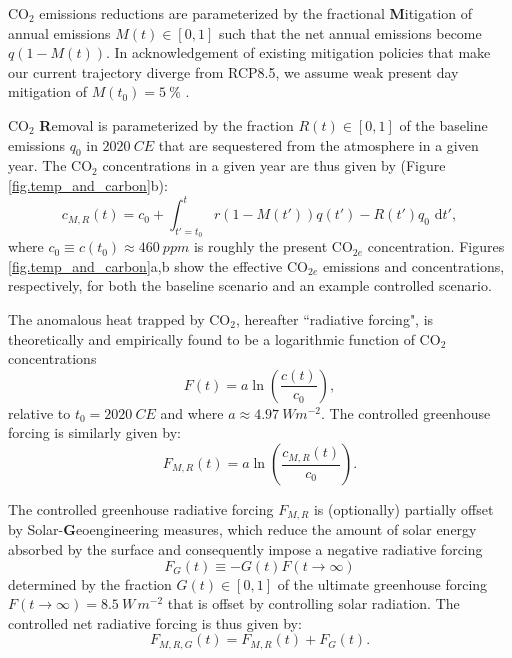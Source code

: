 \documentclass{article}
\begin{document}
CO$_{2}$ emissions reductions are parameterized by the fractional \textbf{M}itigation of annual emissions $M(t) \in [0,1]$ such that the net annual emissions become $q(1-M(t))$. In acknowledgement of existing mitigation policies that make our current trajectory diverge from RCP8.5, we assume weak present day mitigation of $M(t_{0}) = \SI{5}{\%}$ \citep{hausfather_emissions_2020}.

CO$_{2}$ \textbf{R}emoval is parameterized by the fraction $R(t) \in [0,1]$ of the baseline emissions $q_{0}$ in $\SI{2020}{CE}$ that are sequestered from the atmosphere in a given year. The CO$_{2}$ concentrations in a given year are thus given by (Figure \ref{fig.temp_and_carbon}b):
\begin{equation}
    c_{M, R}(t) = c_{0} + \int_{t'=t_{0}}^{t} r(1-M(t'))q(t') - R(t')q_{0} \text{ d}t'\label{eq-CO2-conc},
\end{equation}
where $c_{0} \equiv c(t_{0}) \approx \SI{460}{ppm}$ is roughly the present CO$_{2e}$ concentration. Figures \ref{fig.temp_and_carbon}a,b show the effective CO$_{2e}$ emissions and concentrations, respectively, for both the baseline scenario and an example controlled scenario.

The anomalous heat trapped by CO$_{2}$, hereafter ``radiative forcing", is theoretically and empirically found to be a logarithmic function of CO$_{2}$ concentrations
\begin{equation}
    F(t) = a \ln(\frac{c(t)}{c_{0}}),
\end{equation}
relative to $t_{0} = \SI{2020}{CE}$ and where $a \approx \SI{4.97}{W m^{-2}}$. The controlled greenhouse forcing is similarly given by:
\begin{equation}
    F_{M, R}(t) = a \ln(\frac{c_{M, R}(t)}{c_{0}}).
\end{equation}

The controlled greenhouse radiative forcing $F_{M, R}$ is (optionally) partially offset by Solar-\textbf{G}eoengineering measures, which reduce the amount of solar energy absorbed by the surface and consequently impose a negative radiative forcing
\begin{equation}
F_{G}(t) \equiv -G(t)F(t \rightarrow \infty)
\end{equation}
determined by the fraction $G(t) \in [0,1]$ of the ultimate greenhouse forcing  $F(t \rightarrow \infty) = \SI{8.5}{W\, m^{-2}}$ that is offset by controlling solar radiation. The controlled net radiative forcing is thus given by:
\begin{equation}
    F_{M, R, G}(t) = F_{M, R}(t) + F_{G}(t).
\end{equation}
\end{document}
